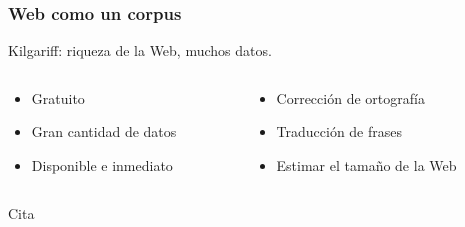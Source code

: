 
\begin{frame}[t]\frametitle{Web como un corpus}
    Kilgariff: riqueza de la Web, muchos datos.

\bigskip
\begin{columns}
    \begin{column}{0.5\textwidth}
        \begin{itemize}
            \item Gratuito
            \item Gran cantidad de datos
            \item Disponible e inmediato
        \end{itemize}
    \end{column}
    \begin{column}{0.5\textwidth}
        \begin{itemize}
            \item Corrección de ortografía
            \item Traducción de frases
            \item Estimar el tamaño de la Web
        \end{itemize}
    \end{column}
\end{columns}

\bigskip
\begin{block}{Cita}
\end{block}

\end{frame}